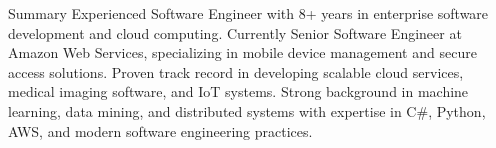 
\begin{category}{Summary}
Experienced Software Engineer with 8+ years in enterprise software development and cloud computing. Currently Senior Software Engineer at Amazon Web Services, specializing in mobile device management and secure access solutions. Proven track record in developing scalable cloud services, medical imaging software, and IoT systems. Strong background in machine learning, data mining, and distributed systems with expertise in C\#, Python, AWS, and modern software engineering practices.
\end{category}
